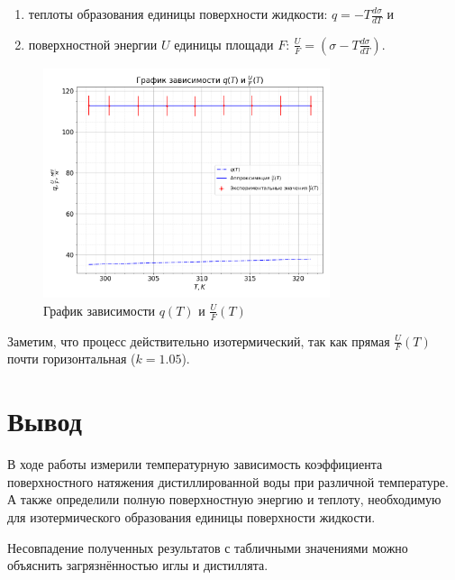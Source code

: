 \documentclass[a4paper, 12pt]{article}
\begin{document}
			\begin{enumerate}
				\item теплоты образования единицы поверхности жидкости: $q = - T \frac{d \sigma}{dT}$ и
				\item поверхностной энергии $U$ единицы площади $F$: $\frac{U}{F} = \left( \sigma - T \frac{d \sigma}{dT} \right)$.
			\end{enumerate}

			\begin{figure}[!ht]
				\centering
				\includegraphics[width=0.75\textwidth]{graph/q_T_and_U_div_F_T_plot.png}
				\caption{График зависимости $q(T)$ и $\frac{U}{F}(T)$}
				\label{plot:q_and_U_div_F}
			\end{figure}

			Заметим, что процесс действительно изотермический, так как прямая $\frac{U}{F}(T)$ почти горизонтальная ($k = 1.05$).

	\section{Вывод}

		В ходе работы измерили температурную зависимость коэффициента поверхностного натяжения дистиллированной воды при различной температуре. А также определили полную поверхностную энергию и теплоту, необходимую для изотермического образования единицы поверхности жидкости.

		Несовпадение полученных результатов с табличными значениями можно объяснить загрязнённостью иглы и дистиллята.
\end{document}

